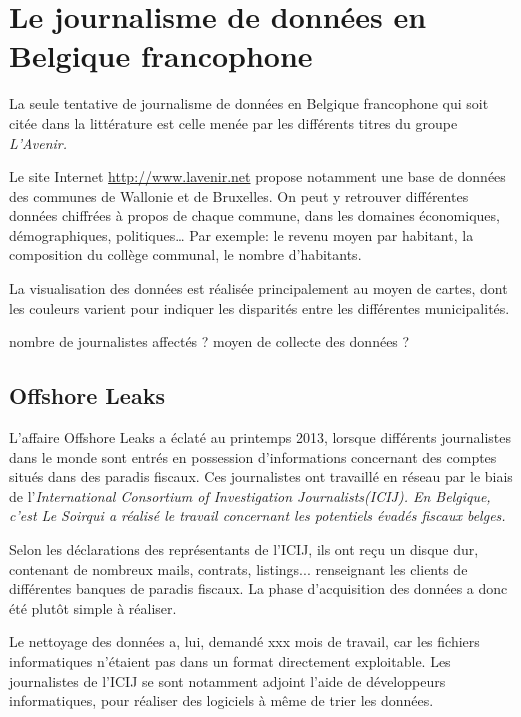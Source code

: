 
\chapter{Le journalisme de données en Belgique francophone}

La seule tentative de journalisme de données en Belgique francophone qui soit citée dans la littérature est celle menée par les différents titres du groupe \em L'Avenir\em.

Le site Internet \url{http://www.lavenir.net} propose notamment une base de données des communes de Wallonie et de Bruxelles. On peut y retrouver différentes données chiffrées à propos de chaque commune, dans les domaines économiques, démographiques, politiques\dots
Par exemple: le revenu moyen par habitant, la composition du collège communal, le nombre d'habitants.

La visualisation des données est réalisée principalement au moyen de cartes, dont les couleurs varient pour indiquer les disparités entre les différentes municipalités. 


nombre de journalistes affectés ?  moyen de collecte des données ?

\section{Offshore Leaks}

L'affaire \og Offshore Leaks \fg a éclaté au printemps 2013, lorsque différents journalistes dans le monde sont entrés en possession d'informations concernant des comptes situés dans des paradis fiscaux. Ces journalistes ont travaillé en réseau par le biais de l'\em International Consortium of Investigation Journalists\em (ICIJ). En Belgique, c'est \em Le Soir\em qui a réalisé le travail concernant les potentiels évadés fiscaux belges.

Selon les déclarations des représentants de l'ICIJ, ils ont reçu un disque dur, contenant de nombreux mails, contrats, listings... renseignant les clients de différentes banques de paradis fiscaux. La phase d'acquisition des données a donc été plutôt simple à réaliser.

Le nettoyage des données a, lui, demandé xxx mois de travail, car les fichiers informatiques n'étaient pas dans un format directement exploitable. Les journalistes de l'ICIJ se sont notamment adjoint l'aide de développeurs informatiques, pour réaliser des logiciels à même de trier les données.

